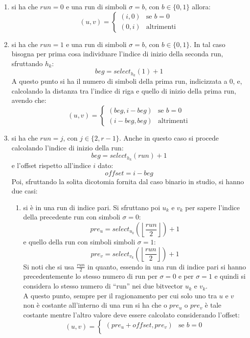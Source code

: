 \begin{enumerate}
  \item si ha che $run=0$ e una run di simboli $\sigma=b$, con $b\in\{0,1\}$
  allora:
  \[(u,v)=
    \begin{cases}
      (i,0)&\mbox{se } b=0\\
      (0,i)&\mbox{altrimenti}
    \end{cases}
  \]
  \item si ha che $run=1$ e una run di simboli $\sigma=b$, con $b\in\{0,1\}$. In
  tal caso bisogna per prima cosa individuare l'indice di inizio della seconda
  run, sfruttando $h_k$:
  \[beg = select_{h_k}(1)+1\]
  A questo punto si ha il numero di simboli della prima run, indicizzata a 0, e,
  calcolando la distanza tra l'indice di riga e quello di inizio della prima
  run, avendo che:
  \[(u,v)=
    \begin{cases}
      (beg,i-beg)&\mbox{se } b=0\\
      (i-beg,beg)&\mbox{altrimenti}
    \end{cases}
  \]
  \item si ha che $run=j$, con $j\in\{2,r-1\}$. Anche in questo caso  si procede
  calcolando l'indice di inizio della run:
  \[beg = select_{h_k}(run)+1\]
  e l'offset rispetto all'indice $i$ dato:
  \[offset = i-beg\]
  Poi, sfruttando la solita dicotomia fornita dal caso binario in studio, si
  hanno due casi: 
  \begin{enumerate}
    \item si è in una run di indice pari.
    Si sfruttano poi $u_k$ e $v_k$ per sapere l'indice della precedente run con
    simboli $\sigma=0$:
    \[pre_u=select_{u_k}\left(\left\lfloor\frac{run}{2}\right\rfloor\right)+1\]
    e quello della run con simboli simboli $\sigma=1$:
    \[pre_v=select_{v_k}\left(\left\lfloor\frac{run}{2}\right\rfloor\right)+1\]
    Si noti che si usa $\frac{run}{2}$ in quanto, essendo in una run di indice
    pari si hanno precedentemente lo stesso numero di run per $\sigma=0$ e per
    $\sigma=1$ e quindi si considera lo stesso numero di ``run'' nei due
    bitvector $u_k$ e $v_k$.\\
    A questo punto, sempre per il ragionamento per cui solo uno tra $u$ e $v$
    non è costante all'interno di una run si ha che o $pre_u$ o $pre_v$ è tale
    costante mentre l'altro valore deve essere calcolato considerando l'offset:
    \[(u,v)=
      \begin{cases}
        (pre_u+offset,pre_v)&\mbox{se } b=0\\

\end{cases}\]
\end{enumerate}
\end{enumerate}

